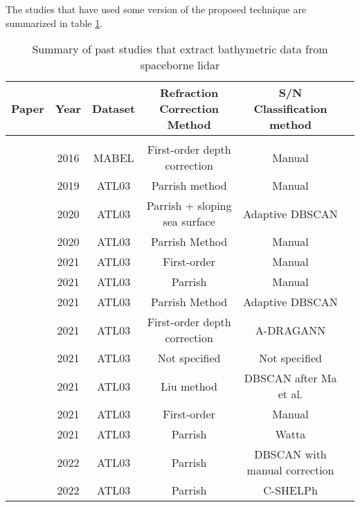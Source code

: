 The studies that have used some version of the proposed technique are summarized in table \ref{tab:researchsummary}.

\begin{table}[h]
      \caption{Summary of past studies that extract bathymetric data from spaceborne lidar}
      \label{tab:researchsummary}
      \raggedright
      \begin{tabular}{rccccc}
            \midrule
            Paper                              & Year & Dataset & Refraction Correction Method  & S/N Classification method     \\ 
            \hline                                                                                                              \\
            \citeauthor{Forfinski-Sarkozi2016} & 2016 & MABEL   & First-order depth correction  & Manual                        \\ 
            \citeauthor{Parrish2019}           & 2019 & ATL03   & Parrish method                & Manual                        \\ 
            \citeauthor{Ma2020}                & 2020 & ATL03   & Parrish + sloping sea surface & Adaptive DBSCAN               \\ 
            \citeauthor{Thomas2021d}           & 2020 & ATL03   & Parrish Method                & Manual                        \\ 
            \citeauthor{Albright2021}          & 2021 & ATL03   & First-order                   & Manual                        \\ 
            \citeauthor{Babbel2021a}           & 2021 & ATL03   & Parrish                       & Manual                        \\ 
            \citeauthor{Xie2021}               & 2021 & ATL03   & Parrish Method                & Adaptive DBSCAN               \\ 
            \citeauthor{Cao2021}               & 2021 & ATL03   & First-order depth correction  & A-DRAGANN                     \\ 
            \citeauthor{Lee2021}               & 2021 & ATL03   & Not specified                 & Not specified                 \\ 
            \citeauthor{Liu2021}               & 2021 & ATL03   & Liu method                    & DBSCAN after Ma et al.        \\ 
            \citeauthor{Coveney2021a}          & 2021 & ATL03   & First-order                   & Manual                        \\ 
            \citeauthor{Datta2021}             & 2021 & ATL03   & Parrish                       & Watta                         \\ 
            \citeauthor{LeQuilleuc2022b}       & 2022 & ATL03   & Parrish                       & DBSCAN with manual correction \\ 
            \citeauthor{Thomas2022}            & 2022 & ATL03   & Parrish                       & C-SHELPh                      \\
            \bottomrule
      \end{tabular}
\end{table}

